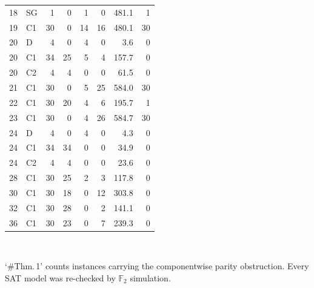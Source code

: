 \begin{table}[tb]
\begin{tabular}{rlrrrrrr}
18 & SG & 1 & 0 & 1 & 0 & 481.1 & 1 \\
19 & C1 & 30 & 0 & 14 & 16 & 480.1 & 30 \\
20 & D & 4 & 0 & 4 & 0 & 3.6 & 0 \\
20 & C1 & 34 & 25 & 5 & 4 & 157.7 & 0 \\
20 & C2 & 4 & 4 & 0 & 0 & 61.5 & 0 \\
21 & C1 & 30 & 0 & 5 & 25 & 584.0 & 30 \\
22 & C1 & 30 & 20 & 4 & 6 & 195.7 & 1 \\
23 & C1 & 30 & 0 & 4 & 26 & 584.7 & 30 \\
24 & D & 4 & 0 & 4 & 0 & 4.3 & 0 \\
24 & C1 & 34 & 34 & 0 & 0 & 34.9 & 0 \\
24 & C2 & 4 & 4 & 0 & 0 & 23.6 & 0 \\
28 & C1 & 30 & 25 & 2 & 3 & 117.8 & 0 \\
30 & C1 & 30 & 18 & 0 & 12 & 303.8 & 0 \\
32 & C1 & 30 & 28 & 0 & 2 & 141.1 & 0 \\
36 & C1 & 30 & 23 & 0 & 7 & 239.3 & 0 \\
\bottomrule
\end{tabular}
\\[2pt]\begin{minipage}{\linewidth}\footnotesize `\#Thm.\,1' counts instances carrying the componentwise parity obstruction. Every SAT model was re-checked by $\mathbb{F}_2$ simulation.\end{minipage}
\end{table}
